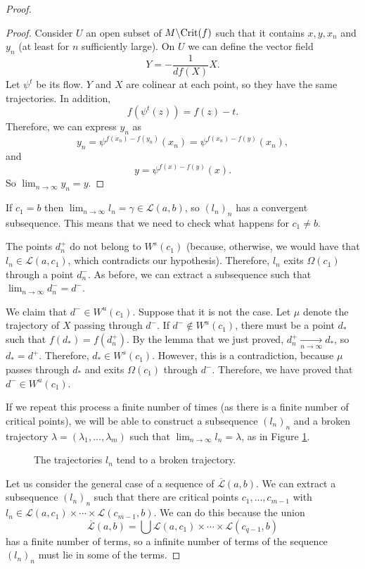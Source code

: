 \begin{proof}
\begin{proof}
Consider $U$ an open subset of $M \backslash \mathrm{Crit}(f)$ such that it contains $x,y, x_n$ and $y_n$ (at least for $n$ sufficiently large). On $U$ we can define the vector field
\[Y = - \frac1{d f(X)} X .\]
Let $\psi^t$ be its flow. $Y$ and $X$ are colinear at each point, so they have the same trajectories. In addition,
\[f(\psi^t(z)) = f(z) - t .\]
Therefore, we can express $y_n$ as
\[y_n = \psi^{f(x_n)-f(y_n)}(x_n) = \psi^{f(x_n)-f(y)}(x_n) ,\]
and
\[y = \psi^{f(x)-f(y)}(x) .\]
So $\displaystyle\lim_{n \rightarrow \infty} y_n = y$.
\end{proof}

If $c_1 = b$ then $\displaystyle\lim_{n \rightarrow \infty} l_n = \gamma \in \mathcal{L}(a,b)$, so $(l_n)_n$ has a convergent subsequence. This means that we need to check what happens for $c_1 \neq b$.

The points $d_n^+$ do not belong to $W^s(c_1)$ (because, otherwise, we would have that $l_n \in \mathcal{L}(a,c_1)$, which contradicts our hypothesis). Therefore, $l_n$ exits $\Omega(c_1)$ through a point $d_n^-$. As before, we can extract a subsequence such that $\displaystyle\lim_{n \rightarrow \infty} d_n^- = d^-$.

We claim that $d^- \in W^u(c_1)$. Suppose that it is not the case. Let $\mu$ denote the trajectory of $X$ passing through $d^-$. If $d^- \notin W^u(c_1)$, there must be a point $d_{\ast}$ such that $f(d_{\ast}) = f(d_n^+)$. By the lemma that we just proved, $d_n^+ \xrightarrow[n \rightarrow \infty]{} d_{\ast}$, so $d_{\ast} = d^+$. Therefore, $d_{\ast} \in W^s(c_1)$. However, this is a contradiction, because $\mu$ passes through $d_{\ast}$ and exits $\Omega(c_1)$ through $d^-$. Therefore, we have proved that $d^- \in W^u(c_1)$.

If we repeat this process a finite number of times (as there is a finite number of critical points), we will be able to construct a subsequence $(l_n)_n$ and a broken trajectory $\lambda = (\lambda_1,...,\lambda_m)$ such that $\displaystyle\lim_{n \rightarrow \infty} l_n = \lambda$, as in Figure \ref{figure:limit_trajectories}.

\begin{figure}[h] \label{figure:limit_trajectories}
	\centering
	
	\caption{The trajectories $l_n$ tend to a broken trajectory.}
\end{figure}

Let us consider the general case of a sequence of $\overline{\mathcal{L}}(a,b)$. We can extract a subsequence $(l_n)_n$ such that there are critical points $c_1,...,c_{m-1}$ with $l_n \in \mathcal{L}(a,c_1) \times \cdots \times \mathcal{L}(c_{m-1},b)$. We can do this because the union
\[\overline{\mathcal{L}}(a,b) = \bigcup \mathcal{L}(a,c_1) \times \cdots \times \mathcal{L}(c_{q-1},b)\]
has a finite number of terms, so a infinite number of terms of the sequence $(l_n)_n$ must lie in some of the terms.


\end{proof}
